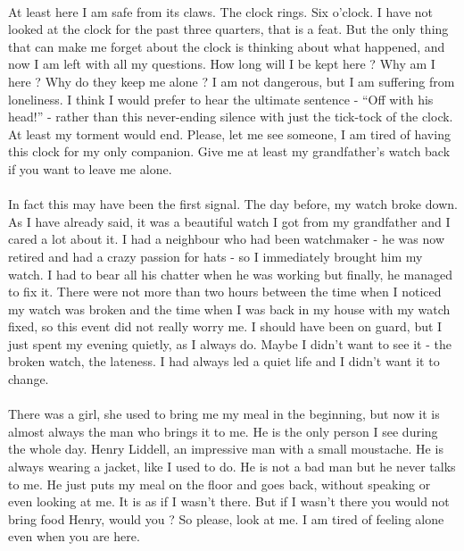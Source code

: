\documentclass[a4paper]{article}
\begin{document}
\\
At least here I am safe from its claws. The clock rings. Six o'clock. I have not looked at the clock for the past three quarters, that is a feat. But the only thing that can make me forget about the clock is thinking about what happened, and now I am left with all my questions. How long will I be kept here ? Why am I here ? Why do they keep me alone ? I am not dangerous, but I am suffering from loneliness. I think I would prefer to hear the ultimate sentence - “Off with his head!” - rather than this never-ending silence with just the tick-tock of the clock. At least my torment would end. Please, let me see someone, I am tired of having this clock for my only companion. Give me at least my grandfather's watch back if you want to leave me alone.\\
\\
In fact this may have been the first signal. The day before, my watch broke down. As I have already said, it was a beautiful watch I got from my grandfather and I cared a lot about it. I had a neighbour who had been watchmaker - he was now retired and had a crazy passion for hats - so I immediately brought him my watch. I had to bear all his chatter when he was working but finally, he managed to fix it. There were not more than two hours between the time when I noticed my watch was broken and the time when I was back in my house with my watch fixed, so this event did not really worry me. I should have been on guard, but I just spent my evening quietly, as I always do. Maybe I didn't want to see it - the broken watch, the lateness. I had always led a quiet life and I didn't want it to change.\\
\\
There was a girl, she used to bring me my meal in the beginning, but now it is almost always the man who brings it to me. He is the only person I see during the whole day. Henry Liddell, an impressive man with a small moustache. He is always wearing a jacket, like I used to do. He is not a bad man but he never talks to me. He just puts my meal on the floor and goes back, without speaking or even looking at me. It is as if I wasn't there. But if I wasn't there you would not bring food Henry, would you ? So please, look at me. I am tired of feeling alone even when you are here.\\ 
\end{document}

